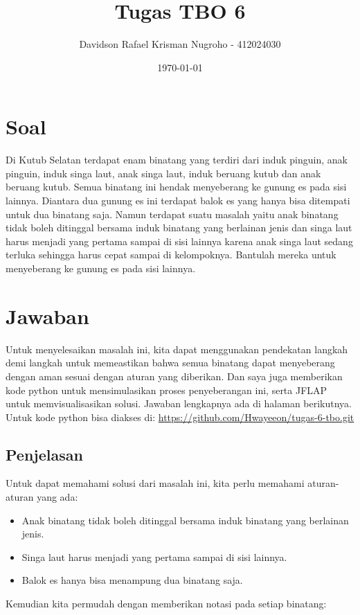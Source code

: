 \documentclass[12pt,a4paper]{article}
\begin{document}
\title{Tugas TBO 6}
\author{Davidson Rafael Krisman Nugroho - 412024030}
\date{\today}
\maketitle

\section*{Soal}
Di Kutub Selatan terdapat enam binatang yang terdiri dari induk pinguin, anak pinguin, induk
singa laut, anak singa laut, induk beruang kutub dan anak beruang kutub. Semua binatang ini
hendak menyeberang ke gunung es pada sisi lainnya. Diantara dua gunung es ini terdapat balok
es yang hanya bisa ditempati untuk dua binatang saja. Namun terdapat suatu masalah yaitu
anak binatang tidak boleh ditinggal bersama induk binatang yang berlainan jenis dan singa laut
harus menjadi yang pertama sampai di sisi lainnya karena anak singa laut sedang terluka
sehingga harus cepat sampai di kelompoknya. Bantulah mereka untuk menyeberang ke gunung es pada sisi lainnya.

\section*{Jawaban}
Untuk menyelesaikan masalah ini, kita dapat menggunakan pendekatan langkah demi langkah untuk memeastikan bahwa 
semua binatang dapat menyeberang dengan aman sesuai dengan aturan yang diberikan. Dan saya juga memberikan kode 
python untuk mensimulasikan proses penyeberangan ini, serta JFLAP untuk memvisualisasikan solusi. Jawaban lengkapnya ada di halaman berikutnya.
Untuk kode python bisa diakses di: \url{https://github.com/Hwayeeon/tugas-6-tbo.git}

\newpage
\subsection*{Penjelasan}

Untuk dapat memahami solusi dari masalah ini, kita perlu memahami aturan-aturan yang ada:
\begin{itemize}
    \item Anak binatang tidak boleh ditinggal bersama induk binatang yang berlainan jenis.
    \item Singa laut harus menjadi yang pertama sampai di sisi lainnya.
    \item Balok es hanya bisa menampung dua binatang saja.
\end{itemize} \noindent
Kemudian kita permudah dengan memberikan notasi pada setiap binatang:
\end{document}
